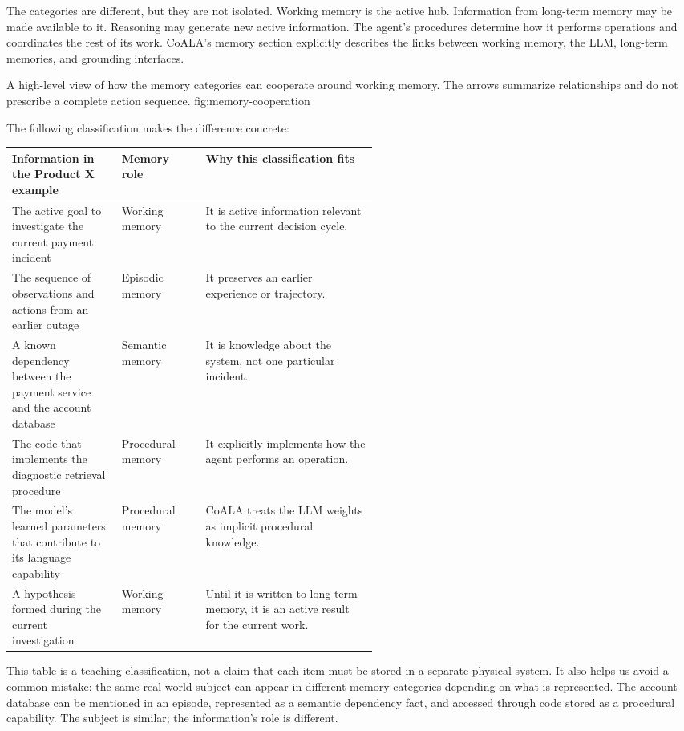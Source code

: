 The categories are different, but they are not isolated. Working memory is the active hub. Information from long-term memory may be made available to it. Reasoning may generate new active information. The agent's procedures determine how it performs operations and coordinates the rest of its work. CoALA's memory section explicitly describes the links between working memory, the LLM, long-term memories, and grounding interfaces.

  {A high-level view of how the memory categories can cooperate around working memory. The arrows summarize relationships and do not prescribe a complete action sequence.}
  {fig:memory-cooperation}

The following classification makes the difference concrete:

\begin{center}
\small
\begin{tabularx}{\linewidth}{@{}p{0.30\linewidth}p{0.23\linewidth}X@{}}
\toprule
\textbf{Information in the Product X example} & \textbf{Memory role} & \textbf{Why this classification fits} \\
\midrule
The active goal to investigate the current payment incident & Working memory & It is active information relevant to the current decision cycle. \\
The sequence of observations and actions from an earlier outage & Episodic memory & It preserves an earlier experience or trajectory. \\
A known dependency between the payment service and the account database & Semantic memory & It is knowledge about the system, not one particular incident. \\
The code that implements the diagnostic retrieval procedure & Procedural memory & It explicitly implements how the agent performs an operation. \\
The model's learned parameters that contribute to its language capability & Procedural memory & CoALA treats the LLM weights as implicit procedural knowledge. \\
A hypothesis formed during the current investigation & Working memory & Until it is written to long-term memory, it is an active result for the current work. \\
\bottomrule
\end{tabularx}
\end{center}

This table is a teaching classification, not a claim that each item must be stored in a separate physical system. It also helps us avoid a common mistake: the same real-world subject can appear in different memory categories depending on what is represented. The account database can be mentioned in an episode, represented as a semantic dependency fact, and accessed through code stored as a procedural capability. The subject is similar; the information's role is different.

